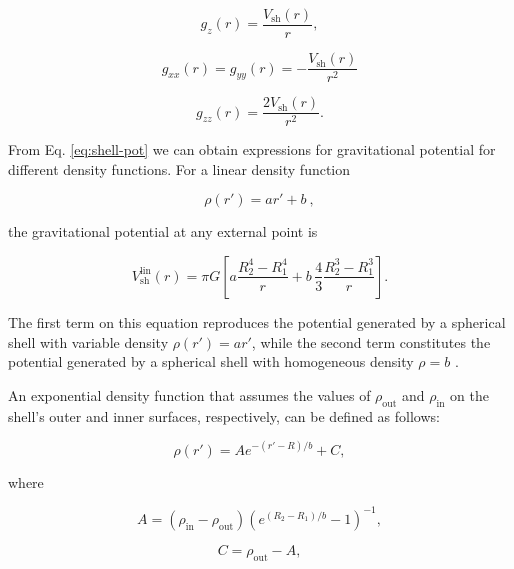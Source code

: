 \documentclass[extra]{gji}
\begin{document}
\begin{equation}
    g_z(r) = \frac{V_\text{sh}(r)}{r},
\end{equation}

\begin{equation}
    g_{xx}(r) = g_{yy}(r) = -\frac{V_\text{sh}(r)}{r^2}
\end{equation}

\begin{equation}
    g_{zz}(r) = \frac{2V_\text{sh}(r)}{r^2}.
\end{equation}

From Eq. \ref{eq:shell-pot} we can obtain expressions for gravitational potential for
different density functions.
For a linear density function

\begin{equation}
    \rho(r') = ar' + b\ ,
\end{equation}

\noindent
the gravitational potential at any external point is

\begin{equation}
    V_\text{sh}^\text{lin}(r) = \pi G \left[
    a \frac{R_2^4 - R_1^4}{r} +
    b \,\frac{4}{3} \frac{R_2^3 - R_1^3}{r} \right].
    \label{eq:shell-pot-linear}
\end{equation}

\noindent The first term on this equation reproduces the potential generated
by a spherical shell with variable density $\rho(r') = ar'$, while the second
term constitutes the potential generated by a spherical shell with homogeneous
density $\rho = b$ \citep{Mikuska2006,Grombein2013}.

An exponential density function that assumes the values of $\rho_\text{out}$ and
$\rho_\text{in}$ on the shell's outer and inner surfaces, respectively, can be defined
as follows:

\begin{equation}
    \rho(r') = A e^{-(r' - R)/b} + C,
\end{equation}

\noindent where

\begin{equation}
    A = (\rho_\text{in} - \rho_\text{out})
        \left( e^{( R_2 - R_1 )/b} - 1 \right)^{-1},
\end{equation}

\begin{equation}
    C = \rho_\text{out} - A,
\end{equation}
\end{document}
